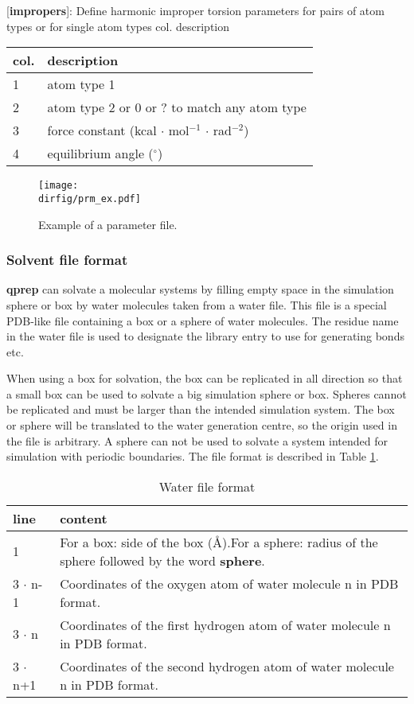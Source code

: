 \documentclass[a4paper,10pt]{article}
\newcommand{\dirfig}{./pictures}
\begin{document}
[\textbf{impropers}]: Define harmonic improper torsion parameters
for pairs of atom types or for single atom types col. description \\
\begin{tabularx}{\textwidth}{|l|X|}
\hline \bf{col.} & \bf{description} \\
\hline 1 & atom type 1 \\
\hline 2 & atom type 2 or 0 or ? to match any atom type \\
\hline 3 & force constant (kcal $\cdot$ mol$^{-1}$ $\cdot$ rad$^{-2}$) \\
\hline 4 & equilibrium angle ($^{\circ}$)\\
\hline
\end{tabularx}
\normalsize

\begin{figure}[h]
\begin{center}
\texttt{[image: \\dirfig/prm\_ex.pdf]}
\caption{Example of a parameter file.} \label{fig:prm_ex}
\end{center}
\end{figure}

\subsubsection{Solvent file format}
\label{subsubsec:solvent_file_format} \textbf{qprep} can solvate a
molecular systems by  filling empty space in the  simulation sphere or
box by water molecules taken from a water file. This file is a special
PDB-like file  containing a box  or a  sphere of water  molecules. The
residue name in the water file  is used to designate the library entry
to use for generating bonds etc.

When  using a  box for  solvation, the  box can  be replicated  in all
direction so that a small box can  be used to solvate a big simulation
sphere or  box. Spheres cannot be  replicated and must be  larger than
the intended simulation  system. The box or sphere  will be translated
to the  water generation  centre, so  the origin used  in the  file is
arbitrary. A sphere  can not be used to solvate  a system intended for
simulation with periodic  boundaries. The file format  is described in
Table \ref{tab:wat_file}.


\begin{table}[h]
\caption{Water file format} \label{tab:wat_file}
\begin{tabularx}{\textwidth}{|l|X|}
\hline \bf{line} & \bf{content}\\
\hline 1 & For a box: side of the box (\AA).For a sphere: radius of
the sphere followed by the word \textbf{sphere}. \\
\hline 3 $\cdot$ n-1 & Coordinates of the oxygen atom of water
molecule n in PDB format. \\
\hline 3 $\cdot$ n & Coordinates of the first hydrogen atom of
water molecule n in PDB format. \\
\hline 3 $\cdot$ n+1 & Coordinates of the second hydrogen atom of
water molecule n in PDB format. \\
\hline
\end{tabularx}
\end{table}
\end{document}
